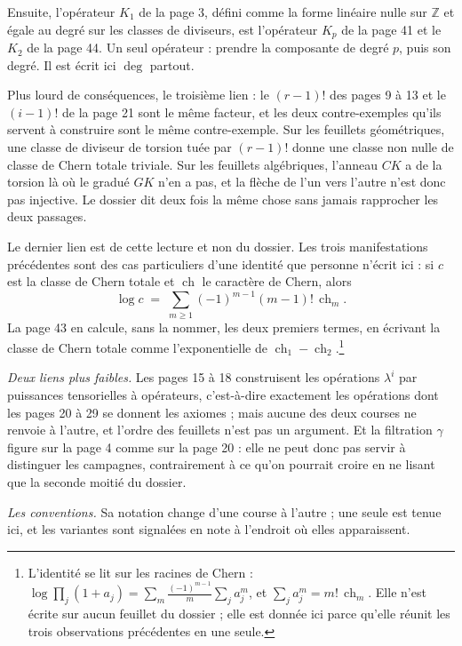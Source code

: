 \documentclass[11pt,a4paper]{article}
\begin{document}
Ensuite, l'opérateur $K_{1}$ de la page 3, défini comme la forme linéaire
nulle sur $\mathbb{Z}$ et égale au degré sur les classes de diviseurs, est
l'opérateur $K_{p}$ de la page 41 et le $K_{2}$ de la page 44. Un seul
opérateur : prendre la composante de degré $p$, puis son degré. Il est écrit
ici $\deg$ partout.

Plus lourd de conséquences, le troisième lien : le $(r-1)!$ des pages 9 à 13 et le
$(i-1)!$ de la page 21 sont le même facteur, et les deux contre-exemples qu'ils
servent à construire sont le même contre-exemple. Sur les feuillets
géométriques, une classe de diviseur de torsion tuée par $(r-1)!$ donne une
classe non nulle de classe de Chern totale triviale. Sur les feuillets
algébriques, l'anneau $CK$ a de la torsion là où le gradué $GK$ n'en a pas, et
la flèche de l'un vers l'autre n'est donc pas injective. Le dossier dit deux
fois la même chose sans jamais rapprocher les deux passages.

Le dernier lien est de cette lecture et non du dossier. Les trois manifestations
précédentes sont des cas particuliers d'une identité que personne n'écrit ici :
si $c$ est la classe de Chern totale et $\operatorname{ch}$ le caractère de
Chern, alors
\[
  \log c \;=\; \sum_{m \geqslant 1} (-1)^{m-1}(m-1)!\,\operatorname{ch}_{m} .
\]
La page 43 en calcule, sans la nommer, les deux premiers termes, en écrivant la
classe de Chern totale comme l'exponentielle de
$\operatorname{ch}_{1} - \operatorname{ch}_{2}$.\footnote{L'identité se lit sur
les racines de Chern : $\log \prod_{j}(1 + a_{j}) = \sum_{m}
\frac{(-1)^{m-1}}{m}\sum_{j} a_{j}^{m}$, et $\sum_{j} a_{j}^{m} = m!\,
\operatorname{ch}_{m}$. Elle n'est écrite sur aucun feuillet du dossier ; elle
est donnée ici parce qu'elle réunit les trois observations précédentes en
une seule.}

\emph{Deux liens plus faibles.}
Les pages 15 à 18 construisent les opérations $\lambda^{i}$ par puissances
tensorielles à opérateurs, c'est-à-dire exactement les opérations dont les
pages 20 à 29 se donnent les axiomes ; mais aucune des deux courses ne renvoie
à l'autre, et l'ordre des feuillets n'est pas un argument. Et la filtration
$\gamma$ figure sur la page 4 comme sur la page 20 : elle ne peut donc pas
servir à distinguer les campagnes, contrairement à ce qu'on pourrait croire en
ne lisant que la seconde moitié du dossier.

\emph{Les conventions.} Sa notation change d'une course à l'autre ; une seule
est tenue ici, et les variantes sont signalées en note à l'endroit où elles
apparaissent.
\end{document}
